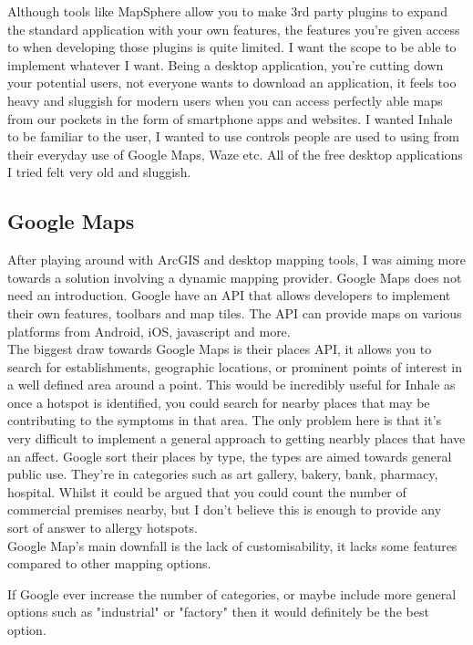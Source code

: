 Although tools like MapSphere allow you to make 3rd party plugins to expand the standard application with your own features, the features you're given access to when developing those plugins is quite limited. I want the scope to be able to implement whatever I want. 
Being a desktop application, you're cutting down your potential users, not everyone wants to download an application, it feels too heavy and sluggish for modern users when you can access perfectly able maps from our pockets in the form of smartphone apps and websites. I wanted Inhale to be familiar to the user, I wanted to use controls people are used to using from their everyday use of Google Maps, Waze etc. All of the free desktop applications I tried felt very old and sluggish.\\

\subsection{Google Maps}

After playing around with ArcGIS and desktop mapping tools, I was aiming more towards a solution involving a dynamic mapping provider. Google Maps does not need an introduction. Google have an API that allows developers to implement their own features, toolbars and map tiles. The API can provide maps on various platforms from Android, iOS, javascript and more.\\

The biggest draw towards Google Maps is their places API, it allows you to search for establishments, geographic locations, or prominent points of interest\cite{googlePlaces} in a well defined area around a point. This would be incredibly useful for Inhale as once a hotspot is identified, you could search for nearby places that may be contributing to the symptoms in that area. The only problem here is that it's very difficult to implement a general approach to getting nearbly places that have an affect. Google sort their places by type, the types are aimed towards general public use. They're in categories such as art gallery, bakery, bank, pharmacy, hospital. Whilst it could be argued that you could count the number of commercial premises nearby, but I don't believe this is enough to provide any sort of answer to allergy hotspots.\\

Google Map's main downfall is the lack of customisability, it lacks some features compared to other mapping options.

If Google ever increase the number of categories, or maybe include more general options such as "industrial" or "factory" then it would definitely be the best option.\\

